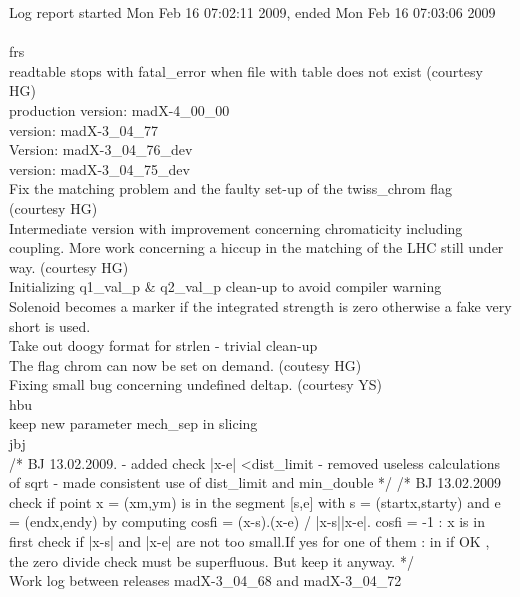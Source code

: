 Log report started Mon Feb 16 07:02:11 2009, ended Mon Feb 16 07:03:06 2009
\\
\\
frs \\ 
readtable stops with fatal\_error when file with table does not exist (courtesy HG)  \\ 
production version: madX-4\_00\_00  \\ 
version: madX-3\_04\_77  \\ 
Version: madX-3\_04\_76\_dev  \\ 
version: madX-3\_04\_75\_dev  \\ 
Fix the matching problem and the faulty set-up of the twiss\_chrom flag (courtesy HG)  \\ 
Intermediate version with improvement concerning chromaticity including coupling. More work concerning a hiccup in the matching of the LHC still under way.           (courtesy HG)  \\ 
Initializing q1\_val\_p \& q2\_val\_p clean-up to avoid compiler warning  \\ 
Solenoid becomes a marker if the integrated strength is zero otherwise a fake very short is used.  \\ 
Take out doogy format for strlen - trivial clean-up  \\ 
The flag chrom can now be set on demand. (coutesy HG)  \\ 
Fixing small bug concerning undefined deltap. (courtesy YS)  \\ 
hbu \\ 
keep new parameter mech\_sep in slicing  \\ 
jbj \\ 
/* BJ 13.02.2009.    - added check |x-e| \textless dist\_limit - removed useless calculations of sqrt - made consistent use of dist\_limit and min\_double */ /* BJ 13.02.2009 check if point x = (xm,ym) is in the segment [s,e] with s = (startx,starty) and e = (endx,endy) by computing cosfi = (x-s).(x-e) / |x-s||x-e|. cosfi = -1 : x is in first check if |x-s| and |x-e| are not too small.If yes for one of them : in if OK , the zero divide check must be superfluous. But keep it anyway. */
\\

Work log between releases madX-3\_04\_68 and madX-3\_04\_72 

